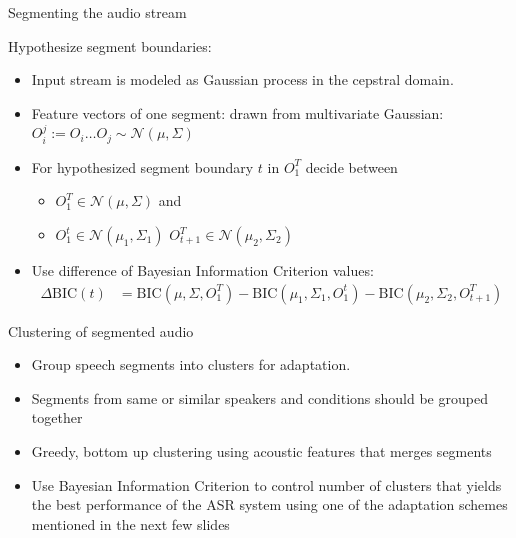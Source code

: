 \begin{frame}{Segmenting the audio stream}
  
 Hypothesize segment boundaries:
 
\begin{itemize}
  \item  Input stream is modeled as Gaussian process in the cepstral domain.
  \item Feature vectors of one segment: drawn from multivariate Gaussian: $O_i^j := O_i \ldots O_j \sim \mathcal{N}(\mu, \Sigma)$ 

  \item For hypothesized segment boundary $t$ in $O_1^T$ decide between
    \begin{itemize}
 
    \item $O_1^T \in \mathcal{N}(\mu, \Sigma)$ and

    \item  $O_1^t \in \mathcal{N}(\mu_1, \Sigma_1)$ $O_{t+1}^T \in \mathcal{N}(\mu_2, \Sigma_2)$
    \end{itemize}
  \item Use difference of Bayesian Information Criterion values:
  \begin{align*}
    \Delta \mathrm{BIC}(t) &= \mathrm{BIC}(\mu, \Sigma, O_1^T) - \mathrm{BIC}(\mu_1, \Sigma_1, O_1^t) - \mathrm{BIC}(\mu_2, \Sigma_2, O_{t+1}^T) 
  \end{align*}
\end{itemize}

\end{frame}

\begin{frame}{Clustering of segmented audio}
\begin{itemize}
  \item  Group speech segments into clusters for adaptation.
  \item  Segments from same or similar speakers and conditions should be grouped together
   \item Greedy, bottom up clustering using acoustic features that merges segments
   \item Use Bayesian Information Criterion to control number of clusters that yields the best performance of the ASR system using one of the adaptation schemes mentioned in the next few slides
\end{itemize}

\end{frame}


